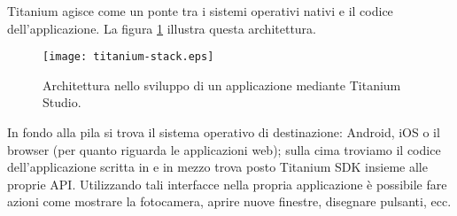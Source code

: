             Titanium agisce come un ponte tra i sistemi operativi nativi e il
            codice dell'applicazione. La figura \ref{fig:ti_stack} illustra
            questa architettura.
            \begin{figure}[h]
                \centering
                \texttt{[image: titanium-stack.eps]}
                \caption{
                    Architettura nello sviluppo di un applicazione \crossplat{}
                    mediante Titanium Studio.
                }
                \label{fig:ti_stack}
            \end{figure}
            In fondo alla pila si trova il sistema
            operativo di destinazione: Android, iOS o il browser (per quanto
            riguarda le applicazioni web); sulla cima troviamo il codice
            dell'applicazione scritta in \js{} e in mezzo trova posto
            Titanium SDK insieme alle proprie API. Utilizzando tali interfacce
            nella propria applicazione è possibile fare azioni come mostrare la
            fotocamera, aprire nuove finestre, disegnare pulsanti, ecc.

